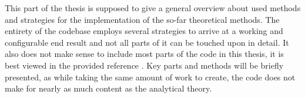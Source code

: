 This part of the thesis is supposed to give a general overview about used methods and strategies for the implementation of the so-far theoretical methods.
The entirety of the codebase employs several strategies to arrive at a working and configurable end result and not all parts of it can be touched upon in detail.
It also does not make sense to include most parts of the code in this thesis, it is best viewed in the provided reference \cite{selfCode}.
Key parts and methods will be briefly presented, as while taking the same amount of work to create, the code does not make for nearly as much content as the analytical theory.